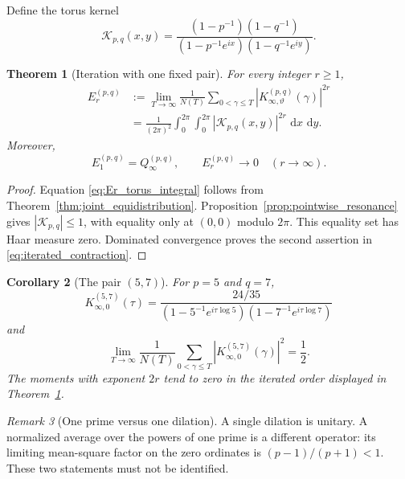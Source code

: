 \documentclass[11pt]{amsart}
\numberwithin{equation}{section}
\theoremstyle{plain}
\newtheorem{theorem}{Theorem}[section]
\newtheorem{corollary}[theorem]{Corollary}
\theoremstyle{definition}
\theoremstyle{remark}
\newtheorem{remark}[theorem]{Remark}
\newcommand{\dd}{\,\mathrm d}
\begin{document}
Define the torus kernel
\begin{equation}
\mathcal K_{p,q}(x,y)
=
\frac{(1-p^{-1})(1-q^{-1})}
{(1-p^{-1}e^{ix})(1-q^{-1}e^{iy})}.
\label{eq:torus_kernel}
\end{equation}

\begin{theorem}[Iteration with one fixed pair]
\label{thm:fixed_pair_iteration}
For every integer $r\geq1$,
\begin{align}
E_r^{(p,q)}
&:=
\lim_{T\to\infty}
\frac1{N(T)}
\sum_{0<\gamma\leq T}
\left|K_{\infty,\vartheta}^{(p,q)}(\gamma)\right|^{2r}
\label{eq:Er_definition}
\\
&=
\frac1{(2\pi)^2}
\int_0^{2\pi}\int_0^{2\pi}
|\mathcal K_{p,q}(x,y)|^{2r}\,\dd x\,\dd y.
\label{eq:Er_torus_integral}
\end{align}
Moreover,
\begin{equation}
E_1^{(p,q)}=Q_\infty^{(p,q)},
\qquad
E_r^{(p,q)}\longrightarrow0
\quad(r\to\infty).
\label{eq:iterated_contraction}
\end{equation}
\end{theorem}

\begin{proof}
Equation \eqref{eq:Er_torus_integral} follows from Theorem~\ref{thm:joint_equidistribution}.  Proposition~\ref{prop:pointwise_resonance} gives $|\mathcal K_{p,q}|\leq1$, with equality only at $(0,0)$ modulo $2\pi$.  This equality set has Haar measure zero.  Dominated convergence proves the second assertion in \eqref{eq:iterated_contraction}.
\end{proof}

\begin{corollary}[The pair $(5,7)$]
\label{cor:five_seven}
For $p=5$ and $q=7$,
\begin{equation}
K_{\infty,0}^{(5,7)}(\tau)
=
\frac{24/35}
{\left(1-5^{-1}e^{i\tau\log5}\right)
 \left(1-7^{-1}e^{i\tau\log7}\right)}
\label{eq:five_seven_kernel}
\end{equation}
and
\begin{equation}
\boxed{
\lim_{T\to\infty}
\frac1{N(T)}
\sum_{0<\gamma\leq T}
\left|K_{\infty,0}^{(5,7)}(\gamma)\right|^2
=\frac12.}
\label{eq:five_seven_half}
\end{equation}
The moments with exponent $2r$ tend to zero in the iterated order displayed in Theorem~\ref{thm:fixed_pair_iteration}.
\end{corollary}

\begin{remark}[One prime versus one dilation]
\label{rem:one_prime}
A single dilation is unitary.  A normalized average over the powers of one prime is a different operator: its limiting mean-square factor on the zero ordinates is $(p-1)/(p+1)<1$.  These two statements must not be identified.
\end{remark}
\end{document}

